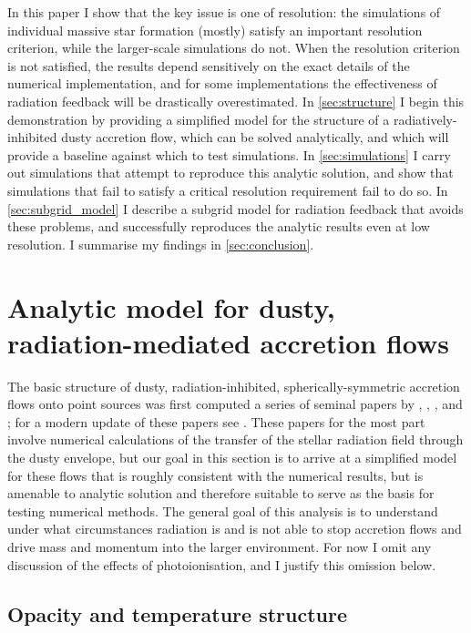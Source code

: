 \documentclass[useAMS,usenatbib]{mn2e}
\begin{document}
In this paper I show that the key issue is one of resolution: the simulations of individual massive star formation (mostly) satisfy an important resolution criterion, while the larger-scale simulations do not. When the resolution criterion is not satisfied, the results depend sensitively on the exact details of the numerical implementation, and for some implementations the effectiveness of radiation feedback will be drastically overestimated. In \autoref{sec:structure} I begin this demonstration by providing a simplified model for the structure of a radiatively-inhibited dusty accretion flow, which can be solved analytically, and which will provide a baseline against which to test simulations. In \autoref{sec:simulations} I carry out simulations that attempt to reproduce this analytic solution, and show that simulations that fail to satisfy a critical resolution requirement fail to do so. In \autoref{sec:subgrid_model} I describe a subgrid model for radiation feedback that avoids these problems, and successfully reproduces the analytic results even at low resolution. I summarise my findings in \autoref{sec:conclusion}.


\section{Analytic model for dusty, radiation-mediated accretion flows}
\label{sec:structure}

The basic structure of dusty, radiation-inhibited, spherically-symmetric accretion flows onto point sources was first computed a series of seminal papers by \citet{larson71a}, \citet{kahn74a}, \citet{leung75a, leung76a}, and \citet{wolfire86a, wolfire87a}; for a modern update of these papers see \citet{reissl18a}. These papers for the most part involve numerical calculations of the transfer of the stellar radiation field through the dusty envelope, but our goal in this section is to arrive at a simplified model for these flows that is roughly consistent with the numerical results, but is amenable to analytic solution and therefore suitable to serve as the basis for testing numerical methods. The general goal of this analysis is to understand under what circumstances radiation is and is not able to stop accretion flows and drive mass and momentum into the larger environment. For now I omit any discussion of the effects of photoionisation, and I justify this omission below.

\subsection{Opacity and temperature structure}
\end{document}
